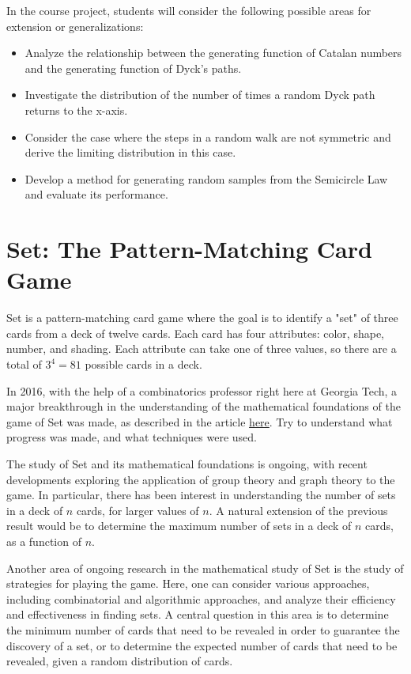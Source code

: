 \documentclass{article}
\begin{document}
    \vspace{3mm}
    \noindent In the course project, students will consider the following possible areas for extension or generalizations:
    \begin{itemize}
        \item Analyze the relationship between the generating function of Catalan numbers and the generating function of Dyck's paths.
        \item Investigate the distribution of the number of times a random Dyck path returns to the x-axis.
        \item Consider the case where the steps in a random walk are not symmetric and derive the limiting distribution in this case.
        \item Develop a method for generating random samples from the Semicircle Law and evaluate its performance.
    \end{itemize}

\pagebreak
\section{Set: The Pattern-Matching Card Game}
Set is a pattern-matching card game where the goal is to identify a "set" of three cards from a deck of twelve cards. Each card has four attributes: color, shape, number, and shading. Each attribute can take one of three values, so there are a total of $3^4=81$ possible cards in a deck.

    \vspace{3mm}
    In 2016, with the help of a combinatorics professor right here at Georgia Tech, a major breakthrough in the understanding of the mathematical foundations of the game of Set was made, as described in the article \href{https://www.quantamagazine.org/set-proof-stuns-mathematicians-20160531/}{here}. Try to understand what progress was made, and what techniques were used.
    
    \vspace{3mm}
    The study of Set and its mathematical foundations is ongoing, with recent developments exploring the application of group theory and graph theory to the game. In particular, there has been interest in understanding the number of sets in a deck of $n$ cards, for larger values of $n$. A natural extension of the previous result would be to determine the maximum number of sets in a deck of $n$ cards, as a function of $n$.
    
    \vspace{3mm}
    Another area of ongoing research in the mathematical study of Set is the study of strategies for playing the game. Here, one can consider various approaches, including combinatorial and algorithmic approaches, and analyze their efficiency and effectiveness in finding sets. A central question in this area is to determine the minimum number of cards that need to be revealed in order to guarantee the discovery of a set, or to determine the expected number of cards that need to be revealed, given a random distribution of cards.
    
\end{document}
